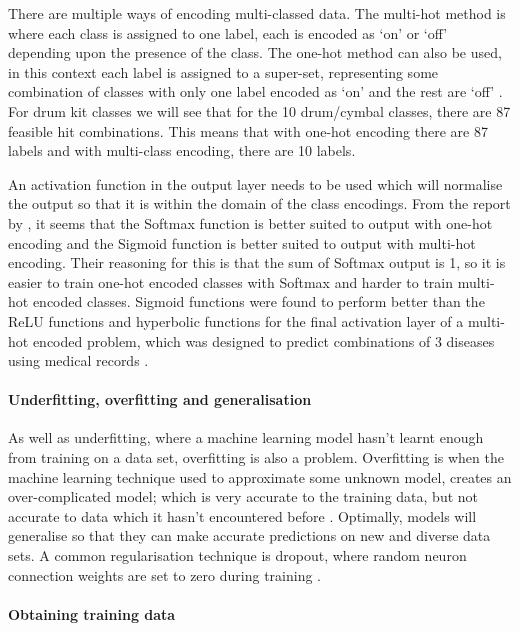 \documentclass[12pt]{article}
\begin{document}
	There are multiple ways of encoding multi-classed data. The multi-hot method is where each class is assigned to one label, each is encoded as `on' or `off' depending upon the presence of the class. The one-hot method can also be used, in this context each label is assigned to a super-set, representing some combination of classes with only one label encoded as `on' and the rest are `off' \parencite{ghlmowyzz2017}. For drum kit classes we will see that for the 10 drum/cymbal classes, there are 87 feasible hit combinations. This means that with one-hot encoding there are 87 labels and with multi-class encoding, there are 10 labels.\medskip
	
	An activation function in the output layer needs to be used which will normalise the output so that it is within the domain of the class encodings. From the report by \textcite{ghlmowyzz2017}, it seems that the Softmax function is better suited to output with one-hot encoding and the Sigmoid function is better suited to output with multi-hot encoding. Their reasoning for this is that the sum of Softmax output is 1, so it is easier to train one-hot encoded classes with Softmax and harder to train multi-hot encoded classes. Sigmoid functions were found to perform better than the ReLU functions and hyperbolic functions for the final activation layer of a multi-hot encoded problem, which was designed to predict combinations of 3 diseases using medical records \parencite{ghlmowyzz2017}.\medskip
	
	\paragraph{Underfitting, overfitting and generalisation} \label{sec:overfitting}
	As well as underfitting, where a machine learning model hasn't learnt enough from training on a data set, overfitting is also a problem. Overfitting is when the machine learning technique used to approximate some unknown model, creates an over-complicated model; which is very accurate to the training data, but not accurate to data which it hasn't encountered before  \parencite[p.143-145]{Rojas}. Optimally, models will generalise so that they can make accurate predictions on new and diverse data sets. A common regularisation technique is dropout, where random neuron connection weights are set to zero during training \parencite{Hinton2014}.\medskip
	
	\paragraph{Obtaining training data}
	\label{sec:data_augmentation}
	
\end{document}
